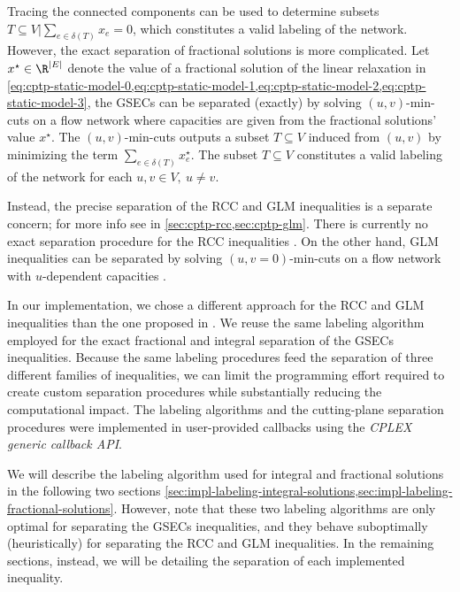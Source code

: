 Tracing the connected components can be used to determine subsets
$T \subseteq V | \sum_{e \in \delta(T)} x_e = 0$,
which constitutes a valid labeling of the network.
However, the exact separation of fractional solutions is more complicated.
Let $x^\star \in \R^{|E|}$ denote the value of a fractional solution of
the linear relaxation in
\cref{eq:cptp-static-model-0,eq:cptp-static-model-1,eq:cptp-static-model-2,eq:cptp-static-model-3},
the GSECs can be separated (exactly) by solving $(u, v)$-min-cuts
on a flow network where capacities are given from the fractional solutions' value $x^\star$.
The $(u, v)$-min-cuts outputs a subset $T \subseteq V$ induced from $(u, v)$ by
minimizing the term $\sum_{e \in \delta(T)} x^\star_e$.
The subset $T \subseteq V$ constitutes a valid labeling of the network for each $u, v \in V,\ u \ne v$.

Instead, the precise separation of the RCC and GLM inequalities
is a separate concern; for more info see in \cref{sec:cptp-rcc,sec:cptp-glm}.
There is currently
no exact separation procedure for the RCC inequalities  \parencite{jepsen2014}.
On the other hand, GLM inequalities can be separated by solving
$(u, v=0)$-min-cuts on a flow network with $u$-dependent capacities \parencite{letchford2006, jepsen2014}.

\medskip

In our implementation, we chose a different approach for the RCC and GLM inequalities
than the one proposed in \textcite{jepsen2014}.
We reuse the same labeling algorithm
employed for the exact fractional and integral separation of the GSECs inequalities.
Because the same labeling procedures feed the separation of three different families of inequalities,
we can limit the programming effort required to create custom separation procedures
while substantially reducing the computational impact.
The labeling algorithms and the cutting-plane separation procedures
were implemented in user-provided callbacks using the \textit{CPLEX generic callback API}.

\medskip

We will describe the labeling algorithm used for integral and fractional solutions
in the following two sections
\cref{sec:impl-labeling-integral-solutions,sec:impl-labeling-fractional-solutions}.
However, note that these two labeling algorithms
are only optimal for separating the GSECs inequalities,
and they behave suboptimally (heuristically) for separating the RCC and GLM inequalities.
In the remaining sections, instead,
we will be detailing the separation of each implemented inequality.

